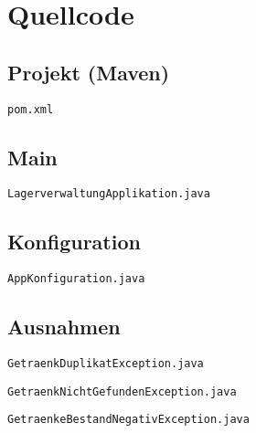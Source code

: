 \chapter{Quellcode}

\section{Projekt (Maven)}

\verb|pom.xml|



\clearpage

\section{Main}

\verb|LagerverwaltungApplikation.java|



\section{Konfiguration}

\verb|AppKonfiguration.java|



\clearpage

\section{Ausnahmen}

\verb|GetraenkDuplikatException.java|



\verb|GetraenkNichtGefundenException.java|



\verb|GetraenkeBestandNegativException.java|



\clearpage

